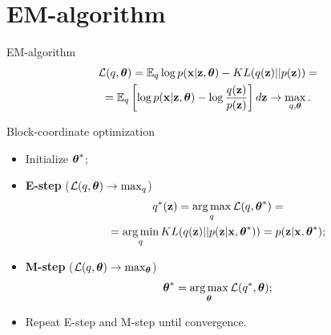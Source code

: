 \section{EM-algorithm}
\begin{frame}{EM-algorithm}
	\vspace{-0.5cm}
	\begin{multline*}
		\mathcal{L} (q, \boldsymbol{\theta})  =  \mathbb{E}_{q} \log p(\mathbf{x} | \mathbf{z}, \boldsymbol{\theta}) - KL (q(\mathbf{z}) || p(\mathbf{z})) = \\ = \mathbb{E}_q \left[ \log p(\mathbf{x} | \mathbf{z}, \boldsymbol{\theta}) - \log \frac{q(\mathbf{z})}{p(\mathbf{z})} \right]d\mathbf{z} \rightarrow \max_{q, \boldsymbol{\theta}}.
	\end{multline*}
	\vspace{-0.5cm}
	\begin{block}{Block-coordinate optimization}
		\begin{itemize}
			\item Initialize $\boldsymbol{\theta}^*$;
			\item \textbf{E-step} ($\mathcal{L} (q, \boldsymbol{\theta}) \rightarrow \max_q$)
			\vspace{-0.2cm}
			\begin{multline*}
				q^*(\mathbf{z}) = \operatorname*{arg\,max}_q \mathcal{L} (q, \boldsymbol{\theta}^*) = \\
				= \operatorname*{arg\,min}_q KL(q(\mathbf{z}) || p(\mathbf{z} | \mathbf{x}, \boldsymbol{\theta}^*)) = p(\mathbf{z}| \mathbf{x}, \boldsymbol{\theta}^*);
			\end{multline*}
			\item \textbf{M-step} ($\mathcal{L} (q, \boldsymbol{\theta}) \rightarrow \max_{\boldsymbol{\theta}}$)
			\vspace{-0.2cm}
			\[
			\boldsymbol{\theta}^* = \operatorname*{arg\,max}_{\boldsymbol{\theta}} \mathcal{L} (q^*, \boldsymbol{\theta});
			\]
			\vspace{-0.2cm}
			\item Repeat E-step and M-step until convergence.
		\end{itemize}
	\end{block}
\end{frame}
